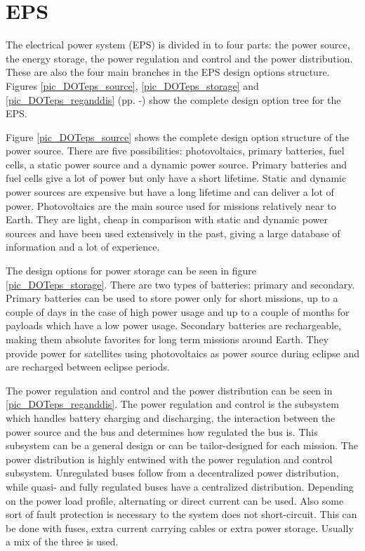 \section{\acl{EPS}}
\label{designOptionsPower}

The electrical power system (EPS) is divided in to four parts: the power source, the energy storage, the power regulation and control and the power distribution. These are also the four main branches in the EPS design options structure. Figures \ref{pic_DOTeps_source}, \ref{pic_DOTeps_storage} and \ref{pic_DOTeps_reganddis} (pp. \pageref{pic_DOTeps_source}-\pageref{pic_DOTeps_reganddis}) show the complete design option tree for the EPS.

Figure \ref{pic_DOTeps_source} shows the complete design option structure of the power source. There are five possibilities: photovoltaics, primary batteries, fuel cells, a static power source and a dynamic power source. Primary batteries and fuel cells give a lot of power but only have a short lifetime. Static and dynamic power sources are expensive but have a long lifetime and can deliver a lot of power. Photovoltaics are the main source used for missions relatively near to Earth. They are light, cheap in comparison with static and dynamic power sources and have been used extensively in the past, giving a large database of information and a lot of experience.

The design options for power storage can be seen in figure \ref{pic_DOTeps_storage}. There are two types of batteries: primary and secondary. Primary batteries can
be used to store power only for short missions, up to a couple of days in the case of high power usage and up to a couple of months for payloads
which have a low power usage. Secondary batteries are rechargeable, making them absolute favorites for long term missions around Earth. They provide
power for satellites using photovoltaics as power source during eclipse and are recharged between eclipse periods.

The power regulation and control and the power distribution can be seen in \ref{pic_DOTeps_reganddis}. The power regulation and control is the subsystem which handles battery charging and discharging, the interaction between the power source and the bus and determines how regulated the bus is. This subsystem can be a general design or can be tailor-designed for each mission. 
The power distribution is highly entwined with the power regulation and control subsystem. Unregulated buses follow from a decentralized power distribution, while quasi- and fully regulated buses have a centralized distribution. Depending on the power load profile, alternating or direct current can be used. Also some sort of fault protection is necessary to the system does not short-circuit. This can be done with fuses, extra current carrying cables or extra power storage. Usually a mix of the three is used.